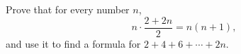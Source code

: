 Prove that for every number $n$,
\[n\cdot\dfrac{2+2n}{2}=n(n+1),\]
and use it to find a formula for $2+4+6+\cdots+2n$.
